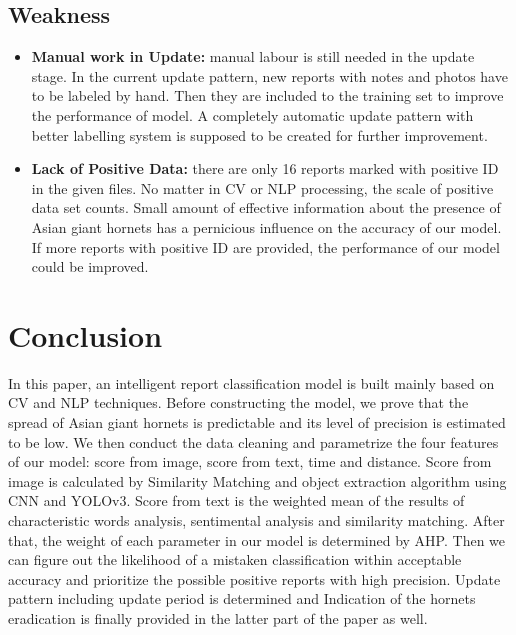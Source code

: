 \documentclass{mcmthesis}
\begin{document}
	\subsection{Weakness}
		\begin{itemize}
			\item \textbf{Manual work in Update:} manual labour is still needed in the update stage. In the current update  pattern, new reports with notes and photos have to be labeled by hand. Then they are included to the training set to improve the performance of model. A completely automatic update pattern with better labelling system is supposed to be created for further improvement.
			\item \textbf{Lack of Positive Data:} there are only 16 reports marked with positive ID in the given files. No matter in CV or NLP processing, the scale of positive data set counts. Small amount of effective information about the presence of Asian giant hornets has a pernicious influence on the accuracy of our model. If more reports with positive ID are provided, the performance of our model could be improved.
		\end{itemize}
\section{Conclusion}
	In this paper, an intelligent report classification model is built mainly based on CV and NLP techniques. Before constructing the model, we prove that the spread of Asian giant hornets is predictable and its level of precision is estimated to be low. We then conduct the data cleaning and parametrize the four features of our model: score from image, score from text, time and distance. Score from image is calculated by Similarity Matching and object extraction algorithm using CNN and YOLOv3. Score from text is the weighted mean of the results of characteristic words analysis, sentimental analysis and similarity matching. After that, the weight of each parameter in our model is determined by AHP.  Then we can figure out the likelihood of a mistaken classification within acceptable accuracy and prioritize the possible positive reports with high precision. Update pattern including update period is determined and Indication of the hornets eradication is finally provided  in the latter part of the paper as well.

\newpage
\end{document}
